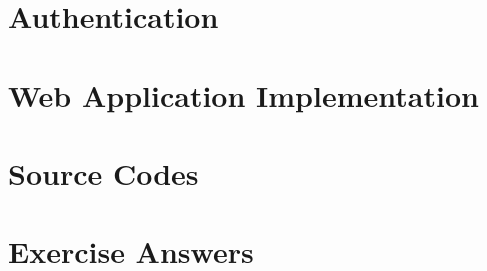 \documentclass[a4paper,10pt,hidelinks]{book}
\begin{document}
    \chapter{Authentication}\label{ch:authentication}
    \minitoc
    
    

    \chapter{Web Application Implementation}\label{ch:web-application-implementation}
    \minitoc
    
    
    
    

    \appendix

    \chapter{Source Codes}\label{ch:source-codes}
    \minitoc
    
    

    \chapter{Exercise Answers}\label{ch:exercise-answers}
    \minitoc
    
    
    
    
\end{document}
